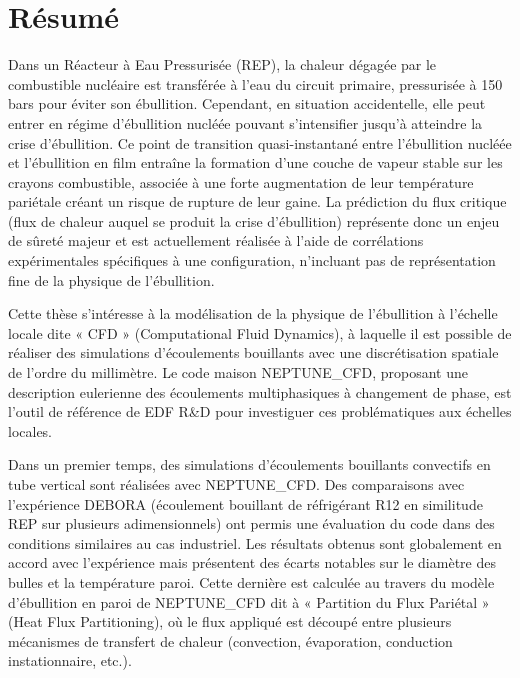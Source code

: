 


\begingroup
\let\clearpage\relax
\let\cleardoublepage\relax
\let\cleardoublepage\relax

\chapter*{Résumé}
Dans un Réacteur à Eau Pressurisée (REP), la chaleur dégagée par le combustible nucléaire est transférée à l’eau du circuit primaire, pressurisée à 150 bars pour éviter son ébullition. Cependant, en situation accidentelle, elle peut entrer en régime d’ébullition nucléée pouvant s’intensifier jusqu’à atteindre la crise d’ébullition. Ce point de transition quasi-instantané entre l’ébullition nucléée et l’ébullition en film entraîne la formation d’une couche de vapeur stable sur les crayons combustible, associée à une forte augmentation de leur température pariétale créant un risque de rupture de leur gaine. La prédiction du flux critique (flux de chaleur auquel se produit la crise d’ébullition) représente donc un enjeu de sûreté majeur et est actuellement réalisée à l’aide de corrélations expérimentales spécifiques à une configuration, n’incluant pas de représentation fine de la physique de l’ébullition. 

\npar


Cette thèse s’intéresse à la modélisation de la physique de l’ébullition à l’échelle locale dite « CFD » (Computational Fluid Dynamics), à laquelle il est possible de réaliser des simulations d’écoulements bouillants avec une discrétisation spatiale de l’ordre du millimètre. Le code maison NEPTUNE\_CFD, proposant une description eulerienne des écoulements multiphasiques à changement de phase, est l’outil de référence de EDF R&D pour investiguer ces problématiques aux échelles locales. 

\npar

Dans un premier temps, des simulations d’écoulements bouillants convectifs en tube vertical sont réalisées avec NEPTUNE\_CFD. Des comparaisons avec l’expérience DEBORA (écoulement bouillant de réfrigérant R12 en similitude REP sur plusieurs adimensionnels) ont permis une évaluation du code dans des conditions similaires au cas industriel. Les résultats obtenus sont globalement en accord avec l’expérience mais présentent des écarts notables sur le diamètre des bulles et la température paroi. Cette dernière est calculée au travers du modèle d’ébullition en paroi de NEPTUNE\_CFD dit à « Partition du Flux Pariétal » (Heat Flux Partitioning), où le flux appliqué est découpé entre plusieurs mécanismes de transfert de chaleur (convection, évaporation, conduction instationnaire, etc.). 

